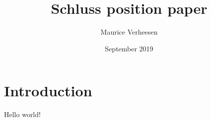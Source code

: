 \documentclass{article}
\title{Schluss position paper}
\author{Maurice Verheesen}
\date{September 2019}
\begin{document}
\maketitle

\section{Introduction}
Hello world!
\end{document}
